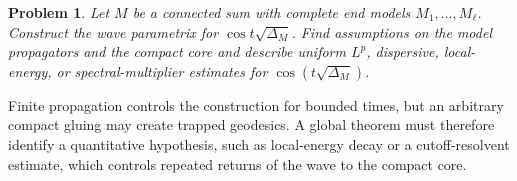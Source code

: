 \documentclass[12pt]{amsart}
\newtheorem{problem}[theorem]{Problem}
\theoremstyle{remark}
\begin{document}



\begin{problem}
\label{prob:wave-gluing}
Let $M$ be a connected sum with complete end models
$M_1,\ldots,M_\ell$. Construct the wave parametrix for $\cos{t\sqrt{\Delta_M}}$. Find assumptions on the model propagators and the compact core and describe uniform $L^p$, dispersive, local-energy, or spectral-multiplier estimates for $\cos(t\sqrt{\Delta_M})$.
\end{problem}

Finite propagation controls the construction for bounded times, but an
arbitrary compact gluing may create trapped geodesics.  A global theorem
must therefore identify a quantitative hypothesis, such as local-energy
decay or a cutoff-resolvent estimate, which controls repeated returns of
the wave to the compact core.
\end{document}
